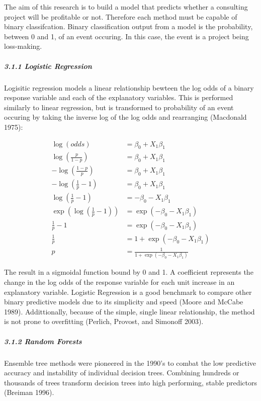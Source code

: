 \documentclass[]{elsarticle} %
\begin{document}
The aim of this research is to build a model that predicts whether a
consulting project will be profitable or not. Therefore each method must
be capable of binary classifcation. Binary classification output from a
model is the probability, between 0 and 1, of an event occuring. In this
case, the event is a project being loss-making.

\subparagraph{3.1.1 Logistic Regression}\label{logistic-regression}

Logisitic regression models a linear relationship bewteen the log odds
of a binary response variable and each of the explanatory variables.
This is performed similarly to linear regression, but is transformed to
probability of an event occuring by taking the inverse log of the log
odds and rearranging (Macdonald 1975):

\[
\begin{aligned}
\log(odds) &= \beta_0 + X_1\beta_1 \\
\log\left(\frac{p}{1-p}\right) &= \beta_0 + X_1\beta_1 \\
-\log\left(\frac{1-p}{p}\right) &= \beta_0 + X_1\beta_1 \\
-\log\left(\frac{1}{p} - 1\right) &= \beta_0 + X_1\beta_1 \\
\log\left(\frac{1}{p} - 1\right) &= -\beta_0 - X_1\beta_1 \\
\exp\left(\log\left(\frac{1}{p} - 1\right)\right) &= \exp(-\beta_0 - X_1\beta_1) \\
\frac{1}{p} - 1 &= \exp(-\beta_0 - X_1\beta_1) \\
\frac{1}{p} &= 1 + \exp(-\beta_0 - X_1\beta_1) \\
p &= \frac{1}{1 + \exp(-\beta_0 - X_1\beta_1)}
\end{aligned}
\]

The result in a sigmoidal function bound by 0 and 1. A coefficient
represents the change in the log odds of the response variable for each
unit increase in an explanatory variable. Logistic Regression is a good
benchmark to compare other binary predictive models due to its
simplicity and speed (Moore and McCabe 1989). Addittionally, because of
the simple, single linear relationship, the method is not prone to
overfitting (Perlich, Provost, and Simonoff 2003).

\subparagraph{3.1.2 Random Forests}\label{random-forests}

Ensemble tree methods were pioneered in the 1990's to combat the low
predictive accuracy and instability of individual decision trees.
Combining hundreds or thousands of trees transform decision trees into
high performing, stable predictors (Breiman 1996).
\end{document}
